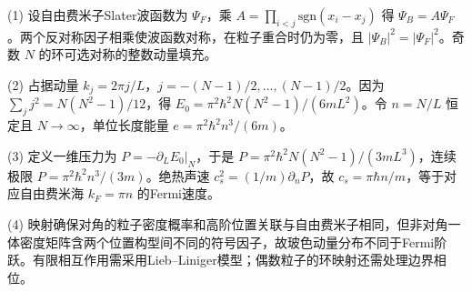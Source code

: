(1) 设自由费米子Slater波函数为 \(\Psi_F\)，乘 \(A=\prod_{i<j}\mathrm{sgn}(x_i-x_j)\) 得 \(\Psi_B=A\Psi_F\)。两个反对称因子相乘使波函数对称，在粒子重合时仍为零，且 \(|\Psi_B|^2=|\Psi_F|^2\)。奇数 \(N\) 的环可选对称的整数动量填充。

(2) 占据动量 \(k_j=2\pi j/L\)，\(j=-(N-1)/2,\ldots,(N-1)/2\)。因为 \(\sum_jj^2=N(N^2-1)/12\)，得 \(\boxed{E_0=\pi^2\hbar^2N(N^2-1)/(6mL^2)}\)。令 \(n=N/L\) 恒定且 \(N\to\infty\)，单位长度能量 \(\boxed{e=\pi^2\hbar^2n^3/(6m)}\)。

(3) 定义一维压力为 \(P=-\partial_LE_0|_N\)，于是 \(P=\pi^2\hbar^2N(N^2-1)/(3mL^3)\)，连续极限 \(P=\pi^2\hbar^2n^3/(3m)\)。绝热声速 \(c_s^2=(1/m)\partial_nP\)，故 \(\boxed{c_s=\pi\hbar n/m}\)，等于对应自由费米海 \(k_F=\pi n\) 的Fermi速度。

(4) 映射确保对角的粒子密度概率和高阶位置关联与自由费米子相同，但非对角一体密度矩阵含两个位置构型间不同的符号因子，故玻色动量分布不同于Fermi阶跃。有限相互作用需采用Lieb–Liniger模型；偶数粒子的环映射还需处理边界相位。

